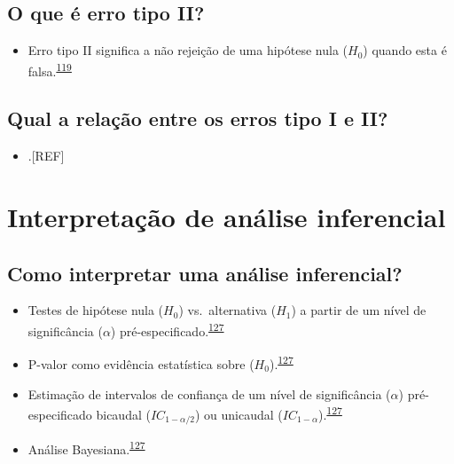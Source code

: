 \documentclass[
  a4paper,
]{book}
\providecommand{\tightlist}{%
  \setlength{\itemsep}{0pt}\setlength{\parskip}{0pt}}
\begin{document}
\hypertarget{o-que-uxe9-erro-tipo-ii}{%
\subsection{O que é erro tipo II?}\label{o-que-uxe9-erro-tipo-ii}}

\begin{itemize}
\tightlist
\item
  Erro tipo II significa a não rejeição de uma hipótese nula (\(H_{0}\)) quando esta é falsa.\textsuperscript{\protect\hyperlink{ref-Curran-Everett2009}{119}}
\end{itemize}

\hypertarget{qual-a-relauxe7uxe3o-entre-os-erros-tipo-i-e-ii}{%
\subsection{Qual a relação entre os erros tipo I e II?}\label{qual-a-relauxe7uxe3o-entre-os-erros-tipo-i-e-ii}}

\begin{itemize}
\tightlist
\item
  .{[}REF{]}
\end{itemize}

\hypertarget{interpretauxe7uxe3o-de-anuxe1lise-inferencial}{%
\section{Interpretação de análise inferencial}\label{interpretauxe7uxe3o-de-anuxe1lise-inferencial}}

\hypertarget{como-interpretar-uma-anuxe1lise-inferencial}{%
\subsection{Como interpretar uma análise inferencial?}\label{como-interpretar-uma-anuxe1lise-inferencial}}

\begin{itemize}
\item
  Testes de hipótese nula (\(H_{0}\)) vs.~alternativa (\(H_{1}\)) a partir de um nível de significância (\(\alpha\)) pré-especificado.\textsuperscript{\protect\hyperlink{ref-goodman2016}{127}}
\item
  P-valor como evidência estatística sobre (\(H_{0}\)).\textsuperscript{\protect\hyperlink{ref-goodman2016}{127}}
\item
  Estimação de intervalos de confiança de um nível de significância (\(\alpha\)) pré-especificado bicaudal (\(IC_{1-\alpha/2}\)) ou unicaudal (\(IC_{1-\alpha}\)).\textsuperscript{\protect\hyperlink{ref-goodman2016}{127}}
\item
  Análise Bayesiana.\textsuperscript{\protect\hyperlink{ref-goodman2016}{127}}
\end{itemize}
\end{document}
